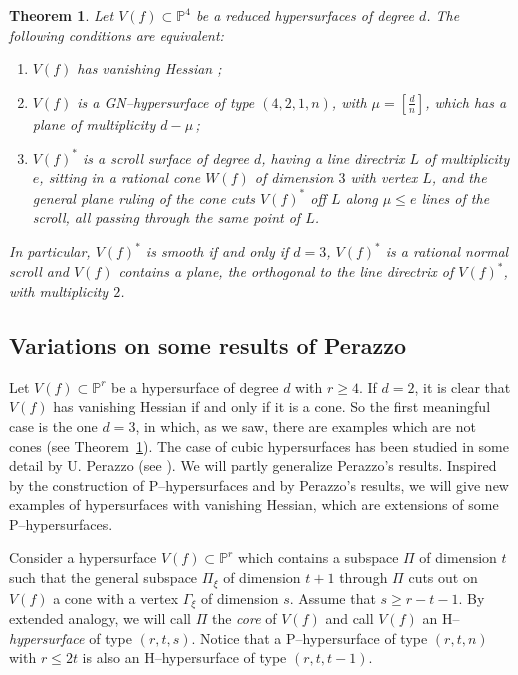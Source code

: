 \documentclass[11pt]{article}   %
\newtheorem{Theorem}{Theorem}
\theoremstyle{definition}
\numberwithin{Theorem}{section} \numberwithin{equation}{section}
\newcommand{\Proj}{{\mathbb P}}
\newcommand{\p}{{\mathbb P}}
\begin{document}
{\begin{Theorem}\label {frank} Let $V(f)\subset \p^4$ be a reduced hypersurfaces
of degree $d$. The following conditions are equivalent:
\begin{enumerate}
\item[{\rm (i)}]  $V(f)$ has vanishing Hessian {\rm ;}
\item[{\rm (ii)}]  $V(f)$ is a {\rm GN}--hypersurface of
type $(4,2,1,n)$, with $\mu=[\frac dn]$, which has a plane of
multiplicity $d-\mu\,${\rm ;}
\item[{\rm (iii)}]  $V(f)^* $ is a
scroll surface of degree $d$, having a line directrix $L$ of
multiplicity $e$, sitting in a rational cone $W(f)$ of dimension $3$
with vertex $L$, and the general plane ruling of the cone cuts
$V(f)^ *$ off $L$ along $\mu\leq e$ lines of the scroll, all passing
through the same point of $L$.
\end{enumerate}
In particular, $V(f)^*$ is smooth if and only if $d=3$,
$V(f)^*$ is a rational normal scroll and $V(f)$ contains a plane, the
orthogonal to the line directrix of $V(f)^ *$, with multiplicity $2$.
\end{Theorem}




\subsection{Variations on some results of Perazzo}\label {Peraz}

Let $V(f)\subset\p^r$ be a hypersurface of degree $d$ with $r\geq
4$. If $d=2$, it is clear that $V(f)$ has vanishing Hessian if and
only if it is a cone. So the first meaningful case is the one $d=3$,
in which, as we saw, there are examples which are not cones (see
Theorem~\ref{frank}). The case of cubic hypersurfaces has been
studied in some detail by U. Perazzo (see \cite{Perazzo}). We will
partly generalize Perazzo's results. Inspired by the construction of
P--hypersurfaces and by Perazzo's results, we will give new examples
of hypersurfaces with vanishing Hessian, which are extensions of
some P--hypersurfaces.

Consider a hypersurface $V(f)\subset\Proj^ r$ which contains a
subspace $\Pi$ of dimension $t$ such that the general subspace
$\Pi_\xi$ of dimension $t+1$ through $\Pi$ cuts out on $V(f)$ a cone
with a vertex $\Gamma_\xi$ of dimension $s$. Assume that $s\geq r-t-1$.
By extended analogy, we will call $\Pi$ the {\it core\/} of $V(f)$
and call $V(f)$ an H--{\it hypersurface\/} of type $(r,t,s)$. Notice
that a P--hypersurface of type $(r,t,n)$ with $r\leq 2t$ is also an
H--hypersurface of type $(r,t,t-1)$.

}
\end{document}
